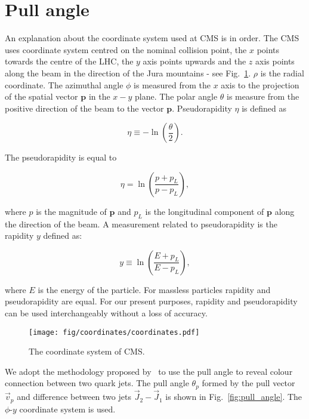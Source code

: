 \section{Pull angle}

An explanation about the coordinate system used at CMS is in order. The CMS uses coordinate system centred on the nominal collision point, the $x$ points towards the centre of the LHC, the $y$ axis points upwards and the $z$ axis points along the beam in the direction of the Jura mountains - see Fig.~\ref{fig:CMScoordinates}. $\rho$ is the radial coordinate. The azimuthal angle $\phi$ is measured from the $x$ axis to the projection of the spatial vector $\textbf{p}$ in the $x-y$ plane. The polar angle $\theta$ is measure from the positive direction of the beam to the vector $\textbf{p}$. Pseudorapidity $\eta$ is defined as

\begin{equation}
\eta\equiv-\ln\left(\frac{\theta}{2}\right).
\end{equation}

The pseudorapidity is equal to

\begin{equation}
\eta=\ln\left(\frac{p+p_{L}}{p-p_{L}}\right),
\end{equation}

where $p$ is the magnitude of $\textbf{p}$ and $p_{L}$ is the longitudinal component of $\textbf{p}$ along the direction of the beam. A measurement related to pseudorapidity is the rapidity $y$ defined as:

\begin{equation}
y\equiv\ln\left(\frac{E+p_{L}}{E-p_{L}}\right),
\end{equation}

where $E$ is the energy of the particle. For massless particles rapidity and pseudorapidity are equal. For our present purposes, rapidity and pseudorapidity can be used interchangeably without a loss of accuracy.

\begin{figure}[hptb]
  \centering
  \texttt{[image: fig/coordinates/coordinates.pdf]}
  \caption{The coordinate system of CMS.}
  \label{fig:CMScoordinates}
\end{figure}

We adopt the methodology proposed by~\cite{Gallicchio:2010sw} to use the pull angle to reveal colour connection between two quark jets. The pull angle $\theta_{p}$ formed by the pull vector $\vec{v}_{p}$ and difference between two jets $\vec{J}_{2}-\vec{J}_{1}$ is shown in Fig.~\ref{fig:pull_angle}. The $\phi$-$y$ coordinate system is used. 


